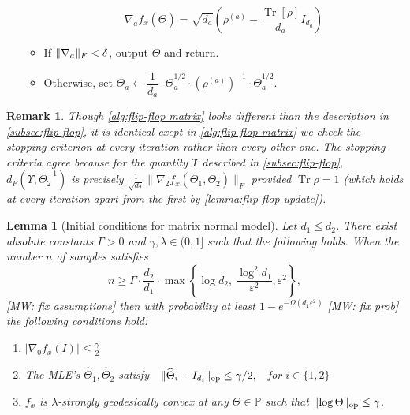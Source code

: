 \documentclass[aos]{imsart}
\newtheorem{lemma}[theorem]{Lemma}
\newtheorem{remark}[theorem]{Remark}
\theoremstyle{definition}
\numberwithin{equation}{section}
\DeclareMathOperator{\op}{op}
\DeclareMathOperator{\tr}{Tr}
\DeclarePairedDelimiter{\norm}{\lVert}{\rVert}
\newcommand{\otheta}{\overline{\Theta}}
\newcommand{\htheta}{\widehat{\Theta}}
\newcommand{\eps}{\varepsilon}
\newcommand{\SPD}{\mathbb{P}}
\newcommand{\samp}{x}
\newcommand{\MW}[1]{{\color{red}[MW: #1]}}
\newcommand{\MW}[1]{{}}
\begin{document}
\begin{Algorithm}
\begin{enumerate}
\begin{itemize}
$$ \nabla_a f_x(\otheta) = \sqrt{d_a}\left( \rho^{(a)} - \dfrac{\tr[\rho]}{d_a} I_{d_a} \right) $$

\vspace{5pt}

\item
If $\norm{\nabla_a}_{F} < \delta$, output $\otheta$ and return.

\vspace{5pt}

\item Otherwise, set $\otheta_a \leftarrow \dfrac{1}{d_a} \cdot \otheta_a^{1/2} \cdot (\rho^{(a)})^{-1} \cdot \otheta_a^{1/2}$.
\end{itemize}
\end{enumerate}
\caption{Matrix flip-flop algorithm}\label{alg:flip-flop matrix}
\end{Algorithm}

\begin{remark} Though \cref{alg:flip-flop matrix} looks different than the description in \cref{subsec:flip-flop}, it is identical exept in \cref{alg:flip-flop matrix} we check the stopping criterion at every iteration rather than every other one. The stopping criteria agree because for the quantity $\Upsilon$ described in \cref{subsec:flip-flop}, $d_F(\Upsilon, \otheta_2^{-1})$ is precisely $\frac{1}{\sqrt{d_2}} \|\nabla_2 f_\samp(\otheta_1, \otheta_2) \|_F$ provided $\tr \rho = 1$ (which holds at every iteration apart from the first by \cref{lemma:flip-flop-update}).
\end{remark}

\begin{lemma}[Initial conditions for matrix normal model]\label{lem:matrix-normal-initial-conditions}
    Let $d_1 \leq d_2$.
    There exist absolute constants $\Gamma > 0$ and $\gamma, \lambda \in (0,1]$ such that the following holds.
	When the number $n$ of samples satisfies
	$$n \geq \Gamma \cdot \dfrac{d_2}{d_1} \cdot \max\left\{ \log d_2, \ \dfrac{\log^2 d_1}{\eps^2} ,\eps^2 \right\},$$ \MW{fix assumptions}
	then with probability at least $1 - e^{- \Omega(d_1 \eps^2)}$ \MW{fix prob} the following conditions hold:
	\begin{enumerate}
		\item $|\nabla_0 f_x(I)| \leq \frac{\gamma}{2}$
		\item The MLE's $\htheta_1, \htheta_2$ satisfy $\ \ \norm{\htheta_i - I_{d_i}}_{\op} \leq \gamma/2, \ \ $ for $i \in \{1,2\}$
		\item $f_x$ is $\lambda$-strongly geodesically convex at any $\Theta \in \SPD$ such that $\norm{\log \Theta}_{\op} \leq \gamma$.
	\end{enumerate}
\end{lemma}
\end{document}
